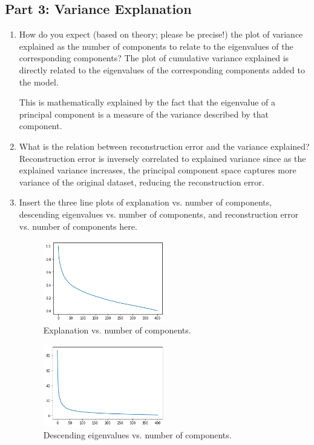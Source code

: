 \subsection{Part 3: Variance Explanation}
\begin{enumerate}
    \item How do you expect (based on theory; please be precise!) the plot of variance explained as the number of components to relate to the eigenvalues of the corresponding components?
    \newline\newline
The plot of cumulative variance explained is directly related to the eigenvalues of the corresponding components added to the model.

This is mathematically explained by the fact that the eigenvalue of a principal component is a measure of the variance described by that component.
    \item What is the relation between reconstruction error and the variance explained?
    \newline\newline
    Reconstruction error is inversely correlated to explained variance since as the explained variance increases, the principal component space captures more variance of the original dataset, reducing the reconstruction error.
    \item Insert the three line plots of explanation vs. number of
    components, descending eigenvalues vs. number of components, and reconstruction error vs. number of components here.
    
\begin{figure}[H]
\centering
\includegraphics[width=0.5\textwidth]{templates/var_plot1}
\caption{Explanation vs. number of components.}
\label{fig:my_label}
\end{figure}

\begin{figure}[H]
	\centering
	\includegraphics[width=0.5\textwidth]{templates/var_plot2}
	\caption{Descending eigenvalues vs. number of components.}
	\label{fig:my_label}
\end{figure}


\end{enumerate}
